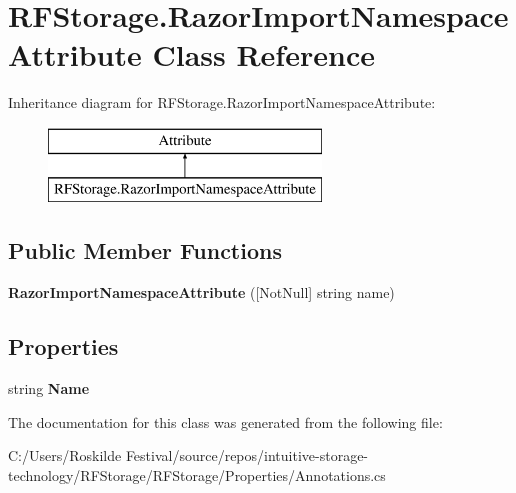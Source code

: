 \hypertarget{class_r_f_storage_1_1_razor_import_namespace_attribute}{}\section{R\+F\+Storage.\+Razor\+Import\+Namespace\+Attribute Class Reference}
\label{class_r_f_storage_1_1_razor_import_namespace_attribute}
Inheritance diagram for R\+F\+Storage.\+Razor\+Import\+Namespace\+Attribute\+:\begin{figure}[H]
\begin{center}
\leavevmode
\includegraphics[height=2.000000cm]{class_r_f_storage_1_1_razor_import_namespace_attribute}
\end{center}
\end{figure}
\subsection*{Public Member Functions}
\begin{DoxyCompactItemize}
\item 
\mbox{\label{class_r_f_storage_1_1_razor_import_namespace_attribute_a9d06ac08038787302d0ebc3e814f066b}} 
{\bfseries Razor\+Import\+Namespace\+Attribute} (\mbox{[}Not\+Null\mbox{]} string name)
\end{DoxyCompactItemize}
\subsection*{Properties}
\begin{DoxyCompactItemize}
\item 
\mbox{\label{class_r_f_storage_1_1_razor_import_namespace_attribute_a1052bc537b7ebf9a132134d1879ae5d4}} 
string {\bfseries Name}
\end{DoxyCompactItemize}


The documentation for this class was generated from the following file\+:\begin{DoxyCompactItemize}
\item 
C\+:/\+Users/\+Roskilde Festival/source/repos/intuitive-\/storage-\/technology/\+R\+F\+Storage/\+R\+F\+Storage/\+Properties/Annotations.\+cs\end{DoxyCompactItemize}
